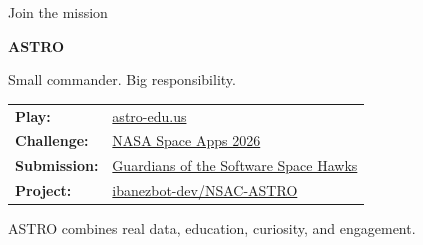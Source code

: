 \documentclass[aspectratio=169,11pt]{beamer}
\begin{document}
\begin{frame}{Join the mission}
  \begin{center}
    {\Huge\bfseries ASTRO}

    \medskip
    {\Large Small commander. Big responsibility.}

    \vspace{.6cm}
    \begin{tabular}{@{}ll@{}}
      \textbf{Play:} & \href{https://astro-edu.us}{\textcolor{astroteal}{astro-edu.us}}\\
      \textbf{Challenge:} & \href{https://www.spaceappschallenge.org/2026/challenges/junior-astronaut-mission-trainer/}{NASA Space Apps 2026}\\
      \textbf{Submission:} & \href{https://www.spaceappschallenge.org/2026/find-a-team/guardians-of-the-software-space-hawks/?tab=project}{Guardians of the Software Space Hawks}\\
      \textbf{Project:} & \href{https://github.com/ibanezbot-dev/NSAC-ASTRO}{ibanezbot-dev/NSAC-ASTRO}
    \end{tabular}

    \vspace{.65cm}
    \small
    ASTRO combines real data, education, curiosity, and engagement.
  \end{center}
\end{frame}
\end{document}

